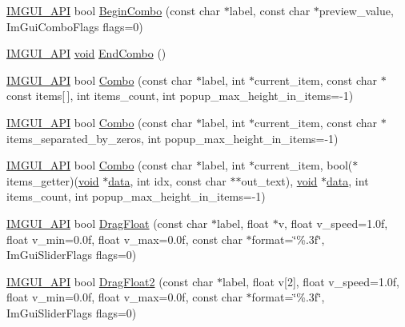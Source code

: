 \begin{DoxyCompactItemize}
\item 
\hyperlink{imgui_8h_a43829975e84e45d1149597467a14bbf5}{I\+M\+G\+U\+I\+\_\+\+A\+PI} bool \hyperlink{namespaceImGui_aa895095bdc7a2907375c555e245575ea}{Begin\+Combo} (const char $\ast$label, const char $\ast$preview\+\_\+value, Im\+Gui\+Combo\+Flags flags=0)
\item 
\hyperlink{imgui_8h_a43829975e84e45d1149597467a14bbf5}{I\+M\+G\+U\+I\+\_\+\+A\+PI} \hyperlink{imgui__impl__opengl3__loader_8h_ac668e7cffd9e2e9cfee428b9b2f34fa7}{void} \hyperlink{namespaceImGui_a63434692d7de278875c7ea0143fbe6e4}{End\+Combo} ()
\item 
\hyperlink{imgui_8h_a43829975e84e45d1149597467a14bbf5}{I\+M\+G\+U\+I\+\_\+\+A\+PI} bool \hyperlink{namespaceImGui_aa2979368da5b9e98d368449b36d166b2}{Combo} (const char $\ast$label, int $\ast$current\+\_\+item, const char $\ast$const items\mbox{[}$\,$\mbox{]}, int items\+\_\+count, int popup\+\_\+max\+\_\+height\+\_\+in\+\_\+items=-\/1)
\item 
\hyperlink{imgui_8h_a43829975e84e45d1149597467a14bbf5}{I\+M\+G\+U\+I\+\_\+\+A\+PI} bool \hyperlink{namespaceImGui_ab982779804105fdc57355868ab531cad}{Combo} (const char $\ast$label, int $\ast$current\+\_\+item, const char $\ast$items\+\_\+separated\+\_\+by\+\_\+zeros, int popup\+\_\+max\+\_\+height\+\_\+in\+\_\+items=-\/1)
\item 
\hyperlink{imgui_8h_a43829975e84e45d1149597467a14bbf5}{I\+M\+G\+U\+I\+\_\+\+A\+PI} bool \hyperlink{namespaceImGui_ae667a68f13233556aa1de9f672dd3f25}{Combo} (const char $\ast$label, int $\ast$current\+\_\+item, bool($\ast$items\+\_\+getter)(\hyperlink{imgui__impl__opengl3__loader_8h_ac668e7cffd9e2e9cfee428b9b2f34fa7}{void} $\ast$\hyperlink{imgui__impl__opengl3__loader_8h_abd87654504355b4c1bb002dcb1d4d16a}{data}, int idx, const char $\ast$$\ast$out\+\_\+text), \hyperlink{imgui__impl__opengl3__loader_8h_ac668e7cffd9e2e9cfee428b9b2f34fa7}{void} $\ast$\hyperlink{imgui__impl__opengl3__loader_8h_abd87654504355b4c1bb002dcb1d4d16a}{data}, int items\+\_\+count, int popup\+\_\+max\+\_\+height\+\_\+in\+\_\+items=-\/1)
\item 
\hyperlink{imgui_8h_a43829975e84e45d1149597467a14bbf5}{I\+M\+G\+U\+I\+\_\+\+A\+PI} bool \hyperlink{namespaceImGui_aab1b20e7bf98aa7bbdb26f8cd3ad91e6}{Drag\+Float} (const char $\ast$label, float $\ast$v, float v\+\_\+speed=1.\+0f, float v\+\_\+min=0.\+0f, float v\+\_\+max=0.\+0f, const char $\ast$format=\char`\"{}\%.\+3f\char`\"{}, Im\+Gui\+Slider\+Flags flags=0)
\item 
\hyperlink{imgui_8h_a43829975e84e45d1149597467a14bbf5}{I\+M\+G\+U\+I\+\_\+\+A\+PI} bool \hyperlink{namespaceImGui_afc9ce10d78534a5c186cee0b337f7471}{Drag\+Float2} (const char $\ast$label, float v\mbox{[}2\mbox{]}, float v\+\_\+speed=1.\+0f, float v\+\_\+min=0.\+0f, float v\+\_\+max=0.\+0f, const char $\ast$format=\char`\"{}\%.\+3f\char`\"{}, Im\+Gui\+Slider\+Flags flags=0)
$$
\end{DoxyCompactItemize}
